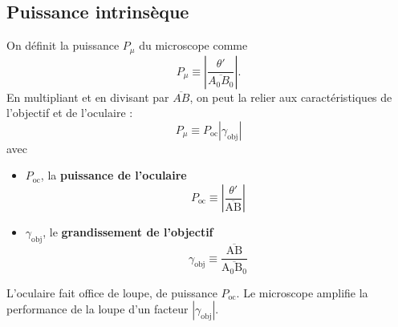 \documentclass[11pt,a4paper]{report}
\begin{document}
\subsection{Puissance intrinsèque}

On définit la puissance $P_\mu$ du microscope comme
\begin{equation}
	\boxed{P_\mu \equiv \left|\frac{\theta'}{\overline{A_0B_0}}\right|}.
\end{equation}
En multipliant et en divisant par $\overline{AB}$, on peut la relier aux caractéristiques de l'objectif et de l'oculaire :
\begin{equation}
	\boxed{P_\mu \equiv P_\text{oc} \left|\gamma_\text{obj}\right|}
\end{equation}
avec
\begin{itemize}
\item $P_\text{oc}$, la \textbf{puissance de l'oculaire}
	\begin{equation}
		P_\text{oc} \equiv \left|\frac{\theta'}{\overline{\text{AB}}}\right|
	\end{equation}
	
\item $\gamma_\text{obj}$, le \textbf{grandissement de l'objectif}
	\begin{equation}
		\gamma_\text{obj} \equiv \frac{\overline{\text{AB}}}{\overline{\text{A}_0\text{B}_0}}
	\end{equation}
\end{itemize}
L'oculaire fait office de loupe, de puissance $P_\text{oc}$. Le microscope amplifie la performance de la loupe d'un facteur $|\gamma_\text{obj}|$.\\
\end{document}
